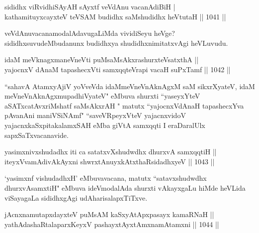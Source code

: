 \begin{shl}
sididhx viRvidhiSAyAH sAyxtf veVdAnu vacanAdiBiH |\\
kathamituyxcayxteV teVSAM budidhx saMshudidhx heVtutaH || 1041 ||
\end{shl}

\begin{artha}
veVdAnuvacanamodalAdavugaLiMda vividiSeyu heVge? sididhxsuvudeMbudanunx budidhxya shudidhxnimitatxvAgi heVLuvudu.
\end{artha}


\begin{shl}
idaM meV\s knagxmaneVneVti puMsaMsAkxrashurxteVsatxthA || \\
yajocnxV dAnaM tapashecxVti samxqqteVrapi vacaH suPxTamf ||  1042 || 
\end{shl}

\begin{artha}
``sahavA AtamxyAjiV yoVveVda idaMmeV\s neVnAknAgxM saM sikxrXyateV, idaM meV\s neVnAknAgxmupadhiVyateV" eMbuva shurxti ``yaseyxYteV aSATxcatAvxriMshatf saMsAkxrAH " matutx ``yajocnxVdAnaH tapashecxYva pAvanAni maniVSiNAmf" ``saveVRpeyxVteV yajacnxvidoV yajacnxkaSxpitakalamxSAH eMba giVtA samxqqti I eraDaralUlx sapxSaTxvacanavide.
\end{artha}


\begin{shl}
\footnotemark[1]yasimxnivxshudadhx iti ca \footnotemark[2]satatxvXshudwdhx dhurxvA samxqqtiH || \\
iteyxVvamAdivAkAyxni shwrxtAnuyxkAtxthaRsidadhxyeV ||  1043 ||  
\end{shl}

\begin{artha}
`yasimxnf vishudadhxH' eMbuvavacana, matutx ``satavxshudwdhx dhurxvAsamxtiH" eMbuva ideVmodalAda shurxti vAkayxgaLu hiMde heVLida viSayagaLa sididhxgAgi udAharisalapxTiTxve.
\end{artha}


\begin{shl}
jAcnxnamutapxdayxteV puMsAM kaSxyAtApxpasayx kamaRNaH || \\
yathA\s \s dashaRtalaparxKeyxV pashayxtAyxtAmxnamAtamxni ||  1044 ||  
\end{shl}

